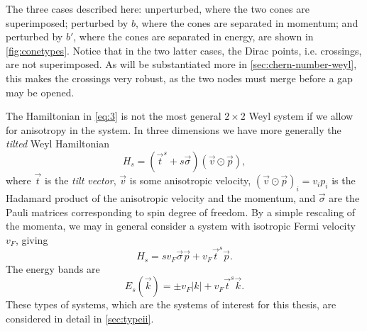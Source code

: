 The three cases described here: unperturbed, where the two cones are superimposed; perturbed by $b$, where the cones are separated in momentum; and perturbed by $b'$, where the cones are separated in energy, are shown in \cref{fig:conetypes}.
Notice that in the two latter cases, the Dirac points, i.e. crossings, are not superimposed.
As will be substantiated more in \cref{sec:chern-number-weyl}, this makes the crossings very robust, as the two nodes must merge before a gap may be opened.


The Hamiltonian in \cref{eq:3} is not the most general \( 2 \times 2 \) Weyl system if we allow for anisotropy in the system.
In three dimensions we have more generally the \emph{tilted} Weyl Hamiltonian
\begin{equation}
  \label{eq:4}
  H_s = (\vec{t}^{s} + s \vec{\sigma}) (\vec{v} \odot \vec{p}),
\end{equation}
where $\vec{t}$ is  the \emph{tilt vector}, $\vec{v}$ is some anisotropic velocity, $(\vec{v} \odot \vec{p})_i = v_i p_i$ is the Hadamard product of the anisotropic velocity and the momentum,  and $\vec{\sigma}$ are the Pauli matrices corresponding to spin degree of freedom.
By a simple rescaling of the momenta, we may in general consider a system with isotropic Fermi velocity \( v_F \), giving
\begin{equation}
  \label{eq:hamil-tilt-isotropic}
  H_s = s v_F \vec{\sigma} \vec{p} + v_F \vec{t}^s \vec{p}.
\end{equation}
The energy bands are
\begin{equation}
  \label{eq:tilted-eigenvalue}
  E_s(\vec{k}) = \pm v_F |k| + v_F \vec{t}^{s} \vec{k}.
\end{equation}
These types of systems, which are the systems of interest for this thesis, are considered in detail in \cref{sec:typeii}.

